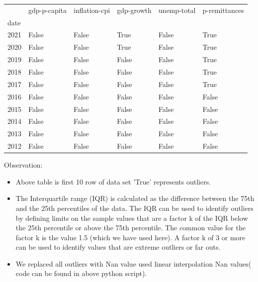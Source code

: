 \begin{tabular}{llllll}
\toprule
{} &  gdp-p-capita &  inflation-cpi &  gdp-growth &  unemp-total &  p-remittances \\
date &               &                &             &              &                \\
\midrule
2021 &         False &          False &        True &        False &           True \\
2020 &         False &          False &        True &        False &           True \\
2019 &         False &          False &       False &        False &           True \\
2018 &         False &          False &       False &        False &           True \\
2017 &         False &          False &       False &        False &           True \\
2016 &         False &          False &       False &        False &          False \\
2015 &         False &          False &       False &        False &          False \\
2014 &         False &          False &       False &        False &          False \\
2013 &         False &          False &       False &        False &          False \\
2012 &         False &          False &       False &        False &          False \\
\bottomrule
\end{tabular}

\vspace{2mm}
Observation:
\begin{itemize}
    \item Above table is first 10 row of data set 'True' represents outliers.
    \item The Interquartile range (IQR) is calculated as the difference between the 75th and the 25th percentiles of the data. The IQR can be used to identify outliers by defining limits on the sample values that are a factor k of the IQR below the 25th percentile or above the 75th percentile. The common value for the factor k is the value 1.5 (which we have used here). A factor k of 3 or more can be used to identify values that are extreme outliers or far outs.
    \item We replaced all outliers with Nan value used linear interpolation Nan values( code can be found in above python script).
    
\end{itemize}

